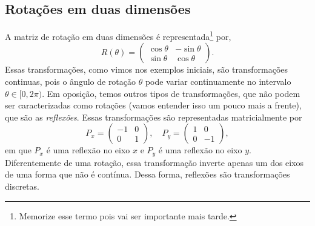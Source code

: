 \documentclass{article}
\numberwithin{equation}{section}
\numberwithin{figure}{section}
\begin{document}
\subsection{Rotações em duas dimensões}
A matriz de rotação em duas dimensões é representada\footnote{Memorize esse termo pois vai ser importante mais tarde.} por,
\begin{equation}\label{rotação 2d}
	R(\theta)=\begin{pmatrix}
		\cos\theta & -\sin\theta \\
		\sin\theta & \cos\theta 
	\end{pmatrix}.
\end{equation}
Essas transformações, como vimos nos exemplos iniciais, são transformações continuas, pois o ângulo de rotação $\theta$ pode variar continuamente no intervalo $\theta\in[0,2\pi)$. Em oposição, temos outros tipos de transformações, que não podem ser caracterizadas como rotações (vamos entender isso um pouco mais a frente), que são as \textit{reflexões}. Essas transformações são representadas matricialmente por
\begin{equation}
	P_x = \begin{pmatrix}
		-1 & 0 \\
		0 & 1
	\end{pmatrix},\quad 
	P_y= \begin{pmatrix}
		1 & 0 \\
		0 & -1
	\end{pmatrix},
\end{equation} em que $P_x$ é uma reflexão no eixo $x$ e $P_y$ é uma reflexão no eixo $y$. 
Diferentemente de uma rotação, essa transformação inverte apenas um dos eixos de uma forma que não é contínua. Dessa forma, reflexões são transformações discretas. 
\end{document}

